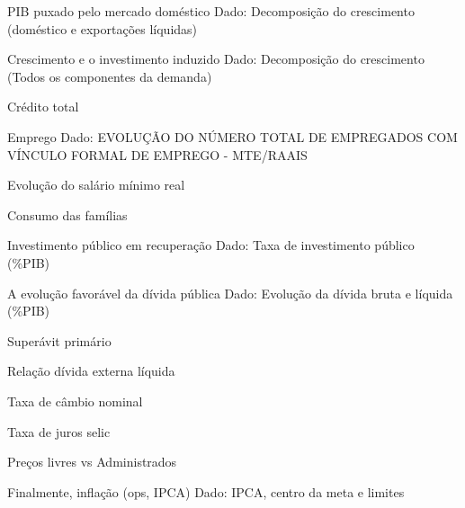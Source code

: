 \documentclass[presentation]{beamer}
\begin{document}
\begin{frame}[label={sec:org2b46afb}]{PIB puxado pelo mercado doméstico}
\alert{Dado:} Decomposição do crescimento (doméstico e exportações líquidas)
\end{frame}

\begin{frame}[label={sec:orge6e9835}]{Crescimento e o investimento induzido}
\alert{Dado:} Decomposição do crescimento (Todos os componentes da demanda)
\end{frame}


\begin{frame}[label={sec:orgb7869df}]{Crédito total}
\end{frame}

\begin{frame}[label={sec:org96cb915}]{Emprego}
\alert{Dado:} EVOLUÇÃO DO NÚMERO TOTAL DE EMPREGADOS COM VÍNCULO FORMAL  DE EMPREGO - MTE/RAAIS
\end{frame}


\begin{frame}[label={sec:org50cec5a}]{Evolução do salário mínimo real}
\end{frame}

\begin{frame}[label={sec:org965e855}]{Consumo das famílias}
\end{frame}

\begin{frame}[label={sec:orgca109c8}]{Investimento público em recuperação}
\alert{Dado:} Taxa de investimento público (\%PIB)
\end{frame}

\begin{frame}[label={sec:org101e787}]{A evolução favorável da dívida pública}
\alert{Dado:} Evolução da dívida bruta e líquida (\%PIB)
\end{frame}

\begin{frame}[label={sec:org640ec85}]{Superávit primário}
\end{frame}

\begin{frame}[label={sec:org67219f0}]{Relação dívida externa líquida}
\end{frame}


\begin{frame}[label={sec:org5c05320}]{Taxa de câmbio nominal}
\end{frame}

\begin{frame}[label={sec:org96ff818}]{Taxa de juros selic}
\end{frame}

\begin{frame}[label={sec:org2856375}]{Preços livres vs Administrados}
\end{frame}

\begin{frame}[label={sec:orgd3b30e0}]{Finalmente, inflação (ops, IPCA)}
\alert{Dado:} IPCA, centro da meta e limites
\end{frame}
\end{document}
